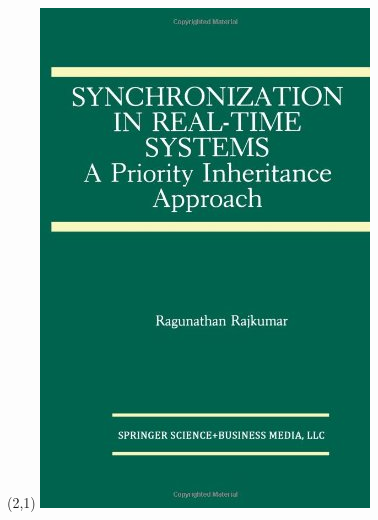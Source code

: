 \documentclass[dvipsnames,14pt,t]{beamer}
\begin{document}
  \begin{frame}[c]

  \begin{textblock}{11}(2,1)
         {\includegraphics[scale=0.125]{pics/p3.jpg}}

\end{textblock}
\end{frame}
\end{document}
